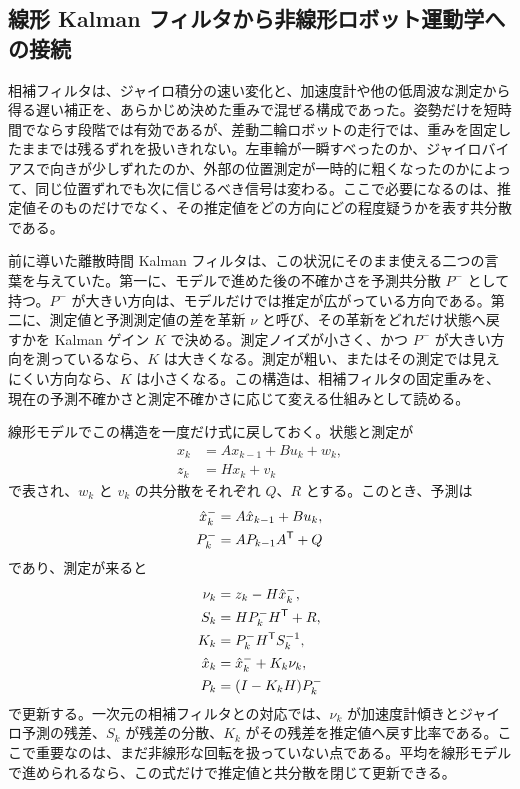 \subsection{線形 Kalman フィルタから非線形ロボット運動学への接続}

相補フィルタは、ジャイロ積分の速い変化と、加速度計や他の低周波な測定から得る遅い補正を、あらかじめ決めた重みで混ぜる構成であった。姿勢だけを短時間でならす段階では有効であるが、差動二輪ロボットの走行では、重みを固定したままでは残るずれを扱いきれない。左車輪が一瞬すべったのか、ジャイロバイアスで向きが少しずれたのか、外部の位置測定が一時的に粗くなったのかによって、同じ位置ずれでも次に信じるべき信号は変わる。ここで必要になるのは、推定値そのものだけでなく、その推定値をどの方向にどの程度疑うかを表す共分散である。

前に導いた離散時間 Kalman フィルタは、この状況にそのまま使える二つの言葉を与えていた。第一に、モデルで進めた後の不確かさを予測共分散 $P^-$ として持つ。$P^-$ が大きい方向は、モデルだけでは推定が広がっている方向である。第二に、測定値と予測測定値の差を革新 $\nu$ と呼び、その革新をどれだけ状態へ戻すかを Kalman ゲイン $K$ で決める。測定ノイズが小さく、かつ $P^-$ が大きい方向を測っているなら、$K$ は大きくなる。測定が粗い、またはその測定では見えにくい方向なら、$K$ は小さくなる。この構造は、相補フィルタの固定重みを、現在の予測不確かさと測定不確かさに応じて変える仕組みとして読める。

線形モデルでこの構造を一度だけ式に戻しておく。状態と測定が
\begin{align}
  x_k&=Ax_{k-1}+Bu_k+w_k,\\
  z_k&=Hx_k+v_k
\end{align}
で表され、$w_k$ と $v_k$ の共分散をそれぞれ $Q$、$R$ とする。このとき、予測は
\begin{align}
  \hat{x}^-_k&=A\hat{x}_{k-1}+Bu_k,\\
  P^-_k&=AP_{k-1}A^{\mathsf{T}}+Q
\end{align}
であり、測定が来ると
\begin{align}
  \nu_k&=z_k-H\hat{x}^-_k,\\
  S_k&=HP^-_kH^{\mathsf{T}}+R,\\
  K_k&=P^-_kH^{\mathsf{T}} S_k^{-1},\\
  \hat{x}_k&=\hat{x}^-_k+K_k\nu_k,\\
  P_k&=(I-K_kH)P^-_k
\end{align}
で更新する。一次元の相補フィルタとの対応では、$\nu_k$ が加速度計傾きとジャイロ予測の残差、$S_k$ が残差の分散、$K_k$ がその残差を推定値へ戻す比率である。ここで重要なのは、まだ非線形な回転を扱っていない点である。平均を線形モデルで進められるなら、この式だけで推定値と共分散を閉じて更新できる。

